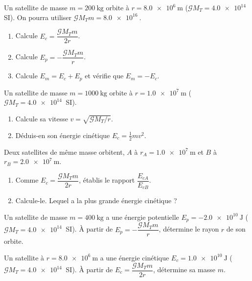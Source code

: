 \documentclass[11pt,a4paper]{article}
\begin{document}

\begin{exo}
Un satellite de masse $m=\qty{200}{\kilogram}$ orbite à $r=\qty{8.0e6}{\metre}$
($\mathcal{G}M_T=\qty{4.0e14}{}$ SI). On pourra utiliser $\mathcal{G}M_T m=\qty{8.0e16}{}$.
\begin{enumerate}[label=\alph*)]
  \item Calcule $E_c=\dfrac{\mathcal{G}M_T m}{2r}$.
  \item Calcule $E_p=-\dfrac{\mathcal{G}M_T m}{r}$.
  \item Calcule $E_m=E_c+E_p$ et vérifie que $E_m=-E_c$.
\end{enumerate}
\end{exo}

\begin{exo}
Un satellite de masse $m=\qty{1000}{\kilogram}$ orbite à $r=\qty{1.0e7}{\metre}$
($\mathcal{G}M_T=\qty{4.0e14}{}$ SI).
\begin{enumerate}[label=\alph*)]
  \item Calcule sa vitesse $v=\sqrt{\mathcal{G}M_T/r}$.
  \item Déduis-en son énergie cinétique $E_c=\tfrac12 m v^2$.
\end{enumerate}
\end{exo}

\begin{exo}
Deux satellites de même masse orbitent, $A$ à $r_A=\qty{1.0e7}{\metre}$ et $B$ à
$r_B=\qty{2.0e7}{\metre}$.
\begin{enumerate}[label=\alph*)]
  \item Comme $E_c=\dfrac{\mathcal{G}M_T m}{2r}$, établis le rapport $\dfrac{E_{cA}}{E_{cB}}$.
  \item Calcule-le. Lequel a la plus grande énergie cinétique ?
\end{enumerate}
\end{exo}

\begin{exo}
Un satellite de masse $m=\qty{400}{\kilogram}$ a une énergie potentielle
$E_p=-\qty{2.0e10}{\joule}$ ($\mathcal{G}M_T=\qty{4.0e14}{}$ SI). À partir de
$E_p=-\dfrac{\mathcal{G}M_T m}{r}$, détermine le rayon $r$ de son orbite.
\end{exo}

\begin{exo}
Un satellite à $r=\qty{8.0e6}{\metre}$ a une énergie cinétique $E_c=\qty{1.0e10}{\joule}$
($\mathcal{G}M_T=\qty{4.0e14}{}$ SI). À partir de $E_c=\dfrac{\mathcal{G}M_T m}{2r}$,
détermine sa masse $m$.
\end{exo}
\end{document}
